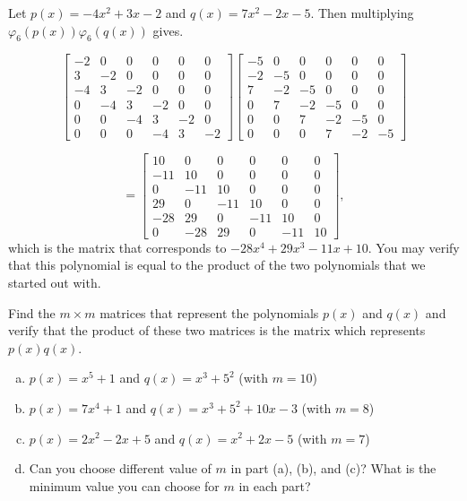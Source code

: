 \begin{example}{}
Let  $p(x)=-4x^2 + 3x - 2$ and $q(x)=7x^2 - 2x - 5$. Then multiplying $\varphi_6(p(x))\varphi_6(q(x))$ gives.

\[\left[\begin{array}{cccccc}-2 & 0 & 0 & 0 & 0 & 0\\3 & -2 & 0 & 0 & 0 & 0\\-4 & 3 & -2 & 0 & 0 & 0\\0 & -4 & 3 & -2 & 0 & 0\\0 & 0 & -4 & 3 & -2 & 0\\0 & 0 & 0 & -4 & 3 & -2\end{array}\right]\left[\begin{array}{cccccc}-5 & 0 & 0 & 0 & 0 & 0\\-2 & -5 & 0 & 0 & 0 & 0\\7 & -2 & -5 & 0 & 0 & 0\\0 & 7 & -2 & -5 & 0 & 0\\0 & 0 & 7 & -2 & -5 & 0\\0 & 0 & 0 & 7 & -2 & -5\end{array}\right]\]

\[= \left[\begin{array}{cccccc}10 & 0 & 0 & 0 & 0 & 0\\-11 & 10 & 0 & 0 & 0 & 0\\0 & -11 & 10 & 0 & 0 & 0\\29 & 0 & -11 & 10 & 0 & 0\\-28 & 29 & 0 & -11 & 10 & 0\\0 & -28 & 29 & 0 & -11 & 10\end{array}\right],\]
which is the matrix that corresponds to $-28x^4 + 29 x^3 - 11x + 10$. You may verify that this polynomial is equal to the product of the two polynomials that we started out with. 
\end{example}

\begin{exercise}{}
Find the $m\times m$ matrices that represent the polynomials $p(x)$ and $q(x)$ and verify that the product of these two matrices is the matrix which represents $p(x)q(x)$.
\begin{enumerate}[(a)]
	\item
	$p(x)=x^5+1$ and $q(x)=x^3+5^2$ (with $m=10$)
	\item
	$p(x)=7x^4+1$ and $q(x)=x^3+5^2+10x-3$ (with $m=8$)
	\item
	$p(x)=2x^2-2x+5$ and $q(x)=x^2+2x-5$ (with $m=7$)
	\item
	Can you choose different value of $m$ in part (a), (b), and (c)? What is the minimum value you can choose for $m$ in each part?

\end{enumerate}
\end{exercise}


